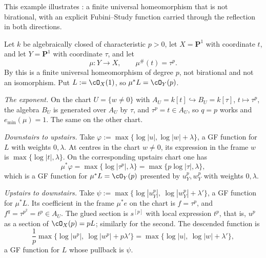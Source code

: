 \begin{example}
\label{ex:ch43-frobenius-reflection}
This example illustrates
: a finite universal homeomorphism
that is not birational, with an explicit Fubini--Study function carried
through the reflection in both directions.

Let $k$ be algebraically closed of characteristic $p>0$, let
$X=\mathbf P^1$ with coordinate $t$, and let $Y=\mathbf P^1$ with
coordinate $\tau$, and let
\[
 \mu:Y\longrightarrow X,
 \qquad
 \mu^\#(t)=\tau^p .
\]
By  this is a finite universal homeomorphism of
degree $p$, not birational and not an isomorphism.  Put
$L:=\cO_X(1)$, so $\mu^*L=\cO_Y(p)$.

\emph{The exponent.}  On the chart $U=\{w\ne0\}$ with
$A_U=k[t]\hookrightarrow B_U=k[\tau]$, $t\mapsto\tau^p$, the algebra
$B_U$ is generated over $A_U$ by $\tau$, and $\tau^p=t\in A_U$, so
$q=p$ works and $e_{\min}(\mu)=1$.  The same on the other chart.

\emph{Downstairs to upstairs.}  Take
$\varphi:=\max\{\log|u|,\log|w|+\lambda\}$, a GF function for $L$
with weights $0,\lambda$.  At centres in the chart $w\ne0$, its
expression in the frame $w$ is $\max\{\log|t|,\lambda\}$.
On the corresponding upstairs chart one has
\[
 \mu^*\varphi=\max\{\log|\tau^p|,\lambda\}
             =\max\{p\log|\tau|,\lambda\},
\]
which is a GF function for $\mu^*L=\cO_Y(p)$ presented by
$u_Y^p,w_Y^p$ with weights $0,\lambda$.

\emph{Upstairs to downstairs.}  Take
$\psi:=\max\{\log|u_Y^p|,\ \log|w_Y^p|+\lambda'\}$, a GF function for
$\mu^*L$.  Its coefficient in the frame $\mu^*e$ on the chart is
$f=\tau^p$, and $f^{q}=\tau^{p^2}=t^p\in A_U$.  The glued section is
$s^{[p]}$ with local expression $t^p$, that is, $u^{p}$ as a section of
$\cO_X(p)=pL$; similarly for the second.  The descended function is
\[
 \frac1p\max\bigl\{\log|u^p|,\ \log|w^p|+p\lambda'\bigr\}
 =\max\bigl\{\log|u|,\ \log|w|+\lambda'\bigr\},
\]
a GF function for $L$ whose pullback is $\psi$.


\end{example}
